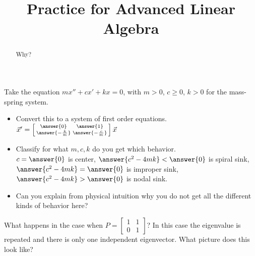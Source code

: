 \documentclass{ximera}
\title{Practice for Advanced Linear Algebra}
\begin{document}
\begin{abstract}
Why?
\end{abstract}
\maketitle

\begin{exercise}
    Take the equation $m x'' + c x' + kx = 0$, with $m > 0$, $c \geq 0$, $k > 0$ for the mass-spring system.
    \begin{itemize}
        \item Convert this to a system of first order equations.\\
        ${\vec{x}}' = \left[\begin{smallmatrix} \answer{0} & \answer{1} \\ \answer{-\frac{k}{m}} & \answer{-\frac{c}{m}} \end{smallmatrix}\right]\vec{x}$
        \item Classify for what $m, c, k$ do you get which behavior.\\
        $c=\answer{0}$ is center, $\answer{c^2 - 4mk} < \answer{0}$ is spiral sink, $\answer{c^2 - 4mk} = \answer{0}$ is improper sink, $\answer{c^2 - 4mk} > \answer{0}$ is nodal sink.
        \item Can you explain from physical intuition why you do not get all the different kinds of behavior here?
    \end{itemize}
\end{exercise}

\begin{exercise}
    What happens in the case when $P = \left[ \begin{smallmatrix} 1 & 1 \\ 0 & 1 \end{smallmatrix} \right]$?  In this case the eigenvalue is repeated and there is only one independent eigenvector. What picture does this look like?
\end{exercise}
\end{document}
